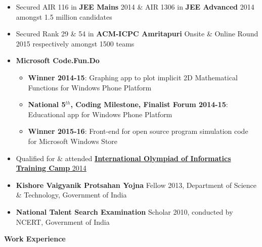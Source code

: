 \documentclass[letterpaper,11pt]{article}
\begin{document}
{\begin{itemize}
    \item Secured AIR 116 in \textbf{JEE Mains} 2014 \& AIR 1306 in \textbf{JEE Advanced} 2014 amongst 1.5 million candidates
    \vspace{-5pt}
    \item Secured Rank 29 \& 54 in \textbf{ACM-ICPC Amritapuri} Onsite \& Online Round 2015 respectively amongst 1500 teams
    \vspace{-5pt}
    \item \textbf{Microsoft Code.Fun.Do}
        \vspace{-4pt}
        \begin{itemize}
            \item \textbf{Winner 2014-15}: Graphing app to plot implicit 2D Mathematical Functions for Windows Phone Platform
            \vspace{-2pt}
            \item \textbf{National 5$^{th}$, Coding Milestone, Finalist Forum 2014-15}: Educational app for Windows Phone Platform
            \vspace{-2pt}
            \item \textbf{Winner 2015-16}: Front-end for open source program simulation code for Microsoft Windows Store
            \vspace{-2pt}
        \end{itemize}
    \vspace{-5pt}
    \item Qualified for \& attended \href{http://www.iarcs.org.in/inoi/2014/inoi2014/results_inoi2014.php}{\textbf{International Olympiad of Informatics Training Camp} 2014}
    \vspace{-5pt}
    \item \textbf{Kishore Vaigyanik Protsahan Yojna} Fellow 2013, Department of Science \& Technology, Government of India
    \vspace{-5pt}
    \item \textbf{National Talent Search Examination} Scholar 2010, conducted by NCERT, Government of India
\end{itemize}

\vspace{-1pt}
\Large{\textbf{Work Experience}}
\small
\vspace{-5pt}

}
\end{document}

